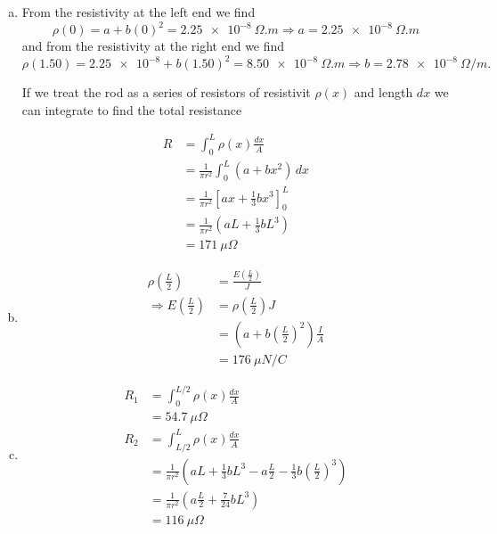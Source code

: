 \documentclass{article}
\begin{document}
\begin{enumerate}[(a)]
  \item From the resistivity at the left end we find \[\rho(0) = a + b (0)^2 = \qty{2.25e-8}{\Omega.m} \Rightarrow a = \qty{2.25e-8}{\Omega.m}\] and from the resistivity at the right end we find \[\rho(1.50) = \num{2.25e-8} + b (1.50)^2 = \qty{8.50e-8}{\Omega.m} \Rightarrow b = \qty{2.78e-8}{\Omega/m}.\]

        If we treat the rod as a series of resistors of resistivit $\rho(x)$ and length $dx$ we can integrate to find the total resistance

        \begin{align*}
          R & = \int_0^L \rho(x) \frac{dx}{A}                               \\
            & = \frac{1}{\pi r^2} \int_0^L (a + b x^2) \,dx                 \\
            & = \frac{1}{\pi r^2} \left[ ax + \frac{1}{3} b x^3 \right]_0^L \\
            & = \frac{1}{\pi r^2} \left( a L + \frac{1}{3} b L^3 \right)    \\
            & = \qty{171}{\mu \Omega}
        \end{align*}

  \item

        \begin{align*}
          \rho \left( \frac{L}{2} \right)          & = \frac{E \left( \frac{L}{2} \right)}{J}                        \\
          \Rightarrow E \left( \frac{L}{2} \right) & = \rho \left( \frac{L}{2} \right) J                             \\
                                                   & = \left( a + b \left( \frac{L}{2} \right)^2 \right) \frac{I}{A} \\
                                                   & = \qty{176}{\mu N/C}
        \end{align*}

  \item

        \begin{align*}
          R_1 & = \int_0^{L / 2} \rho (x) \frac{dx}{A}                                                                                  \\
              & = \qty{54.7}{\mu \Omega}                                                                                                \\
          R_2 & = \int_{L / 2}^L \rho (x) \frac{dx}{A}                                                                                  \\
              & = \frac{1}{\pi r^2} \left( a L + \frac{1}{3} b L^3 - a \frac{L}{2} - \frac{1}{3} b \left( \frac{L}{2} \right)^3 \right) \\
              & = \frac{1}{\pi r^2} \left( a \frac{L}{2} + \frac{7}{24} b L^3 \right)                                                   \\
              & = \qty{116}{\mu \Omega}
        \end{align*}
\end{enumerate}
\end{document}
